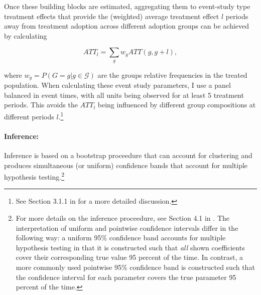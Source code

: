 Once these building blocks are estimated, aggregating them to event-study type treatment effects that provide the (weighted)
average treatment effect $l$ periods away from treatment adoption across
different adoption groups can be achieved by calculating

\begin{equation}
    \label{eq:att_es}
    ATT_l = \sum_g w_gATT(g,g+l),
\end{equation}

\noindent where $w_g = P(G = g | g \in \mathcal{G})$ are the groups relative frequencies in the
treated population. When calculating these event study parameters, I use a
panel balanced in event times, with all units being observed for at least 5
treatment periods. This avoids the $ATT_l$ being influenced by different
group compositions at different periods $l$.\footnote{See Section 3.1.1 in
\citet{callaway2021difference} for a more detailed discussion.}


\paragraph{Inference:}%
\label{par:inference_}

Inference is based on a bootstrap proceedure that can account for clustering
and produces simultaneous (or uniform) confidence bands that account for
multiple hypothesis testing.\footnote{For more details on the inference
    proceedure, see Section 4.1 in \citet{callaway2021difference}. The
    interpretation of uniform and pointwise confidence intervals differ in the
    following way: a uniform 95\% confidence band accounts for multiple
    hypothesis testing in that it is constructed such that \textit{all} shown
    coefficients cover their corresponding true value 95 percent of the time.
    In contrast, a more commonly used pointwise 95\% confidence band is
    constructed such that the confidence interval for each parameter covers the
true parameter 95 percent of the time.} 




